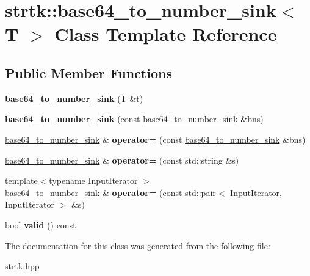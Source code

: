 \hypertarget{classstrtk_1_1base64__to__number__sink}{\section{strtk\-:\-:base64\-\_\-to\-\_\-number\-\_\-sink$<$ T $>$ Class Template Reference}
\label{classstrtk_1_1base64__to__number__sink}
}
\subsection*{Public Member Functions}
\begin{DoxyCompactItemize}
\item 
\hypertarget{classstrtk_1_1base64__to__number__sink_ac5cdb8329872d6769a52fe8a720b4044}{{\bfseries base64\-\_\-to\-\_\-number\-\_\-sink} (T \&t)}\label{classstrtk_1_1base64__to__number__sink_ac5cdb8329872d6769a52fe8a720b4044}

\item 
\hypertarget{classstrtk_1_1base64__to__number__sink_a7cfb1605477b334d5aa339f8dce5330d}{{\bfseries base64\-\_\-to\-\_\-number\-\_\-sink} (const \hyperlink{classstrtk_1_1base64__to__number__sink}{base64\-\_\-to\-\_\-number\-\_\-sink} \&bns)}\label{classstrtk_1_1base64__to__number__sink_a7cfb1605477b334d5aa339f8dce5330d}

\item 
\hypertarget{classstrtk_1_1base64__to__number__sink_aba7e6a9cde73b1fcb59e283cb003d6f2}{\hyperlink{classstrtk_1_1base64__to__number__sink}{base64\-\_\-to\-\_\-number\-\_\-sink} \& {\bfseries operator=} (const \hyperlink{classstrtk_1_1base64__to__number__sink}{base64\-\_\-to\-\_\-number\-\_\-sink} \&bns)}\label{classstrtk_1_1base64__to__number__sink_aba7e6a9cde73b1fcb59e283cb003d6f2}

\item 
\hypertarget{classstrtk_1_1base64__to__number__sink_a3b3737d548397ab70a493c11a923b0bf}{\hyperlink{classstrtk_1_1base64__to__number__sink}{base64\-\_\-to\-\_\-number\-\_\-sink} \& {\bfseries operator=} (const std\-::string \&s)}\label{classstrtk_1_1base64__to__number__sink_a3b3737d548397ab70a493c11a923b0bf}

\item 
\hypertarget{classstrtk_1_1base64__to__number__sink_a7b9795d60b0d2065b15ed54bcdd578d2}{{\footnotesize template$<$typename Input\-Iterator $>$ }\\\hyperlink{classstrtk_1_1base64__to__number__sink}{base64\-\_\-to\-\_\-number\-\_\-sink} \& {\bfseries operator=} (const std\-::pair$<$ Input\-Iterator, Input\-Iterator $>$ \&s)}\label{classstrtk_1_1base64__to__number__sink_a7b9795d60b0d2065b15ed54bcdd578d2}

\item 
\hypertarget{classstrtk_1_1base64__to__number__sink_a5bcbbe5ed1680ad2e88d88948e028724}{bool {\bfseries valid} () const }\label{classstrtk_1_1base64__to__number__sink_a5bcbbe5ed1680ad2e88d88948e028724}

\end{DoxyCompactItemize}


The documentation for this class was generated from the following file\-:\begin{DoxyCompactItemize}
\item 
strtk.\-hpp\end{DoxyCompactItemize}
